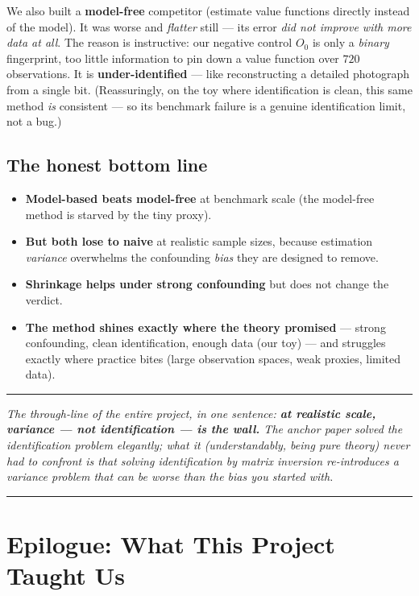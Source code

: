 \documentclass[11pt]{article}
\newenvironment{takeaway}
  {\par\vspace{4pt}\noindent\begin{center}\begin{minipage}{0.94\linewidth}%
   \color{black!88}\rule{\linewidth}{0.7pt}\par\vspace{3pt}\small\itshape}
  {\par\vspace{3pt}\rule{\linewidth}{0.7pt}\end{minipage}\end{center}\vspace{4pt}}
\newcommand{\Ob}{O_0}
\begin{document}
We also built a \textbf{model-free} competitor (estimate value functions directly
instead of the model). It was worse and \emph{flatter} still --- its error
\emph{did not improve with more data at all}. The reason is instructive: our negative
control $\Ob$ is only a \emph{binary} fingerprint, too little information to pin down
a value function over $720$ observations. It is \textbf{under-identified} --- like
reconstructing a detailed photograph from a single bit. (Reassuringly, on the toy
where identification is clean, this same method \emph{is} consistent --- so its
benchmark failure is a genuine identification limit, not a bug.)

\subsection{The honest bottom line}
\begin{itemize}
  \item \textbf{Model-based beats model-free} at benchmark scale (the model-free
  method is starved by the tiny proxy).
  \item \textbf{But both lose to naive} at realistic sample sizes, because estimation
  \emph{variance} overwhelms the confounding \emph{bias} they are designed to remove.
  \item \textbf{Shrinkage helps under strong confounding} but does not change the
  verdict.
  \item \textbf{The method shines exactly where the theory promised} --- strong
  confounding, clean identification, enough data (our toy) --- and struggles exactly
  where practice bites (large observation spaces, weak proxies, limited data).
\end{itemize}

\begin{takeaway}
The through-line of the entire project, in one sentence: \textbf{at realistic scale,
variance --- not identification --- is the wall.} The anchor paper solved the
identification problem elegantly; what it (understandably, being pure theory) never
had to confront is that solving identification by matrix inversion re-introduces a
variance problem that can be worse than the bias you started with.
\end{takeaway}

\section*{Epilogue: What This Project Taught Us}
\end{document}
